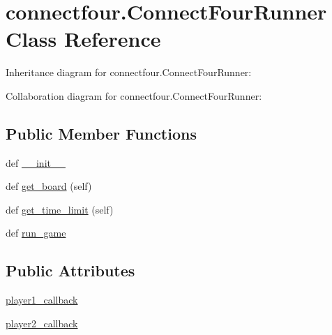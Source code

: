 \hypertarget{classconnectfour_1_1_connect_four_runner}{}\section{connectfour.\+Connect\+Four\+Runner Class Reference}
\label{classconnectfour_1_1_connect_four_runner}


Inheritance diagram for connectfour.\+Connect\+Four\+Runner\+:


Collaboration diagram for connectfour.\+Connect\+Four\+Runner\+:
\subsection*{Public Member Functions}
\begin{DoxyCompactItemize}
\item 
def \hyperlink{classconnectfour_1_1_connect_four_runner_a5732bc3d38f772be013ec8bb0b9baeff}{\+\_\+\+\_\+init\+\_\+\+\_\+}
\item 
def \hyperlink{classconnectfour_1_1_connect_four_runner_abbeac92677d7463c480ea70c5549b054}{get\+\_\+board} (self)
\item 
def \hyperlink{classconnectfour_1_1_connect_four_runner_a57927a6244036c9e76b9c767c2ab5371}{get\+\_\+time\+\_\+limit} (self)
\item 
def \hyperlink{classconnectfour_1_1_connect_four_runner_a4c808906ef0d9fe6f1dbf043777ff4ac}{run\+\_\+game}
\end{DoxyCompactItemize}
\subsection*{Public Attributes}
\begin{DoxyCompactItemize}
\item 
\hyperlink{classconnectfour_1_1_connect_four_runner_a1f7cbaa7df8b4dd89aa596acb4977109}{player1\+\_\+callback}
\item 
\hyperlink{classconnectfour_1_1_connect_four_runner_a5b19a63b068583b57e75e425dbe0fcde}{player2\+\_\+callback}
\end{DoxyCompactItemize}


